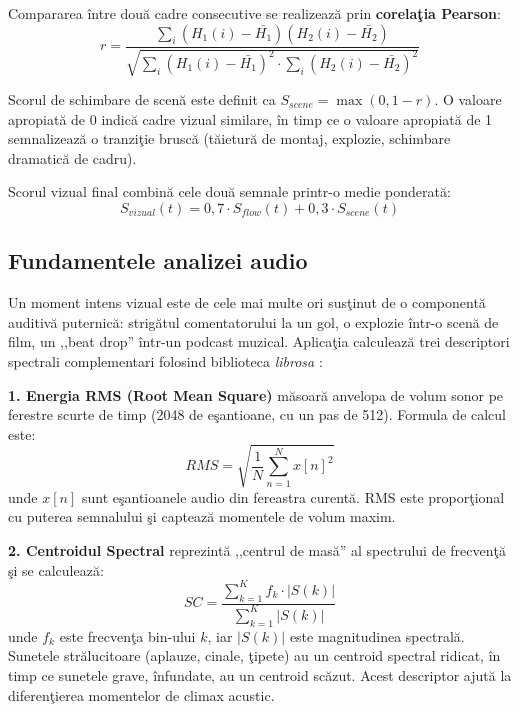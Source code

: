 \documentclass[12pt,a4paper]{article}
\begin{document}
Compararea \^{i}ntre dou\u{a}{} cadre consecutive se realizeaz\u{a}{} prin \textbf{corela\c{t}ia Pearson}:
\begin{equation}
    r = \frac{\sum_{i}(H_1(i) - \bar{H_1})(H_2(i) - \bar{H_2})}{\sqrt{\sum_{i}(H_1(i)-\bar{H_1})^2 \cdot \sum_{i}(H_2(i)-\bar{H_2})^2}}
\end{equation}

Scorul de schimbare de scen\u{a}{} este definit ca $S_{scene} = \max(0, 1 - r)$. O valoare apropiat\u{a}{} de 0 indic\u{a}{} cadre vizual similare, \^{i}n timp ce o valoare apropiat\u{a}{} de 1 semnalizeaz\u{a}{} o tranzi\c{t}ie brusc\u{a}{} (t\u{a}ietur\u{a}{} de montaj, explozie, schimbare dramatic\u{a}{} de cadru).

Scorul vizual final combin\u{a}{} cele dou\u{a}{} semnale printr-o medie ponderat\u{a}:
\begin{equation}
    S_{vizual}(t) = 0{,}7 \cdot S_{flow}(t) + 0{,}3 \cdot S_{scene}(t)
\end{equation}

\subsection{Fundamentele analizei audio}

Un moment intens vizual este de cele mai multe ori sus\c{t}inut de o component\u{a}{} auditiv\u{a}{} puternic\u{a}: strig\u{a}tul comentatorului la un gol, o explozie \^{i}ntr-o scen\u{a}{} de film, un ,,beat drop'' \^{i}ntr-un podcast muzical. Aplica\c{t}ia calculeaz\u{a}{} trei descriptori spectrali complementari folosind biblioteca \textit{librosa} \cite{librosa2015}:

\textbf{1. Energia RMS (Root Mean Square)} m\u{a}soar\u{a}{} anvelopa de volum sonor pe ferestre scurte de timp (2048 de e\c{s}antioane, cu un pas de 512). Formula de calcul este:
\begin{equation}
    RMS = \sqrt{\frac{1}{N} \sum_{n=1}^{N} x[n]^2}
\end{equation}
unde $x[n]$ sunt e\c{s}antioanele audio din fereastra curent\u{a}. RMS este propor\c{t}ional cu puterea semnalului \c{s}i capteaz\u{a}{} momentele de volum maxim.

\textbf{2. Centroidul Spectral} reprezint\u{a}{} ,,centrul de mas\u{a}'' al spectrului de frecven\c{t}\u{a}{} \c{s}i se calculeaz\u{a}:
\begin{equation}
    SC = \frac{\sum_{k=1}^{K} f_k \cdot |S(k)|}{\sum_{k=1}^{K} |S(k)|}
\end{equation}
unde $f_k$ este frecven\c{t}a bin-ului $k$, iar $|S(k)|$ este magnitudinea spectral\u{a}. Sunetele str\u{a}lucitoare (aplauze, cinale, \c{t}ipete) au un centroid spectral ridicat, \^{i}n timp ce sunetele grave, \^{i}nfundate, au un centroid sc\u{a}zut. Acest descriptor ajut\u{a}{} la diferen\c{t}ierea momentelor de climax acustic.
\end{document}
